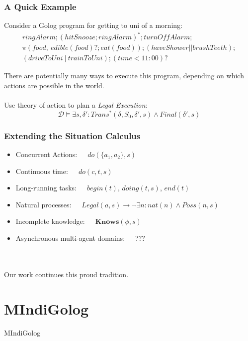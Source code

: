 \documentclass{beamer}
\newcommand{\Dt}{\mathcal{D}}
\newcommand{\Knows}{\mathbf{Knows}}
\begin{document}
\begin{frame}
\frametitle{A Quick Example}
Consider a Golog program for getting to uni of a morning:\[
\begin{array}{c}
ringAlarm;(hitSnooze; ringAlarm)^*;turnOffAlarm;\\
\pi(food,\ edible(food)?;eat(food)); (haveShower || brushTeeth);\\
(driveToUni\ |\ trainToUni); (time<11:00)?
\end{array}\]

There are potentially many ways to execute this program, depending on which 
actions are possible in the world.
\pause
\ \\
\ \\
Use theory of action to plan a \emph{Legal Execution}:\[
\Dt \models \exists s,\delta': Trans^{*}(\delta,S_0,\delta',s) \wedge Final(\delta',s)\]

\end{frame}

\begin{frame}
\frametitle{Extending the Situation Calculus}
\begin{itemize}
\pause
\item Concurrent Actions:\pause\ \ \ $do(\{a_1,a_2\},s)$
\pause
\item Continuous time:\pause\ \ \ $do(c,t,s)$
\pause
\item Long-running tasks:\pause\ \ \ $begin(t)$, $doing(t,s)$, $end(t)$
\pause
\item Natural processes:\pause\ \ \ $Legal(a,s)\rightarrow\neg\exists n: nat(n) \wedge Poss(n,s)$
\pause
\item Incomplete knowledge:\pause\ \ \ $\Knows(\phi,s)$
\pause
\item Asynchronous multi-agent domains:\pause\ \ \ ???
\end{itemize}
\ \\
\ \\
\pause
Our work continues this proud tradition.
\end{frame}

\section{MIndiGolog}

\begin{frame}
\centering \large MIndiGolog\\
\end{frame}
\end{document}
